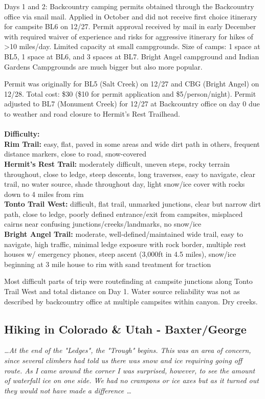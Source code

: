 \documentclass[10pt,a4paper]{article}
\newcommand\subsect[1]{%
  \subsection*{#1}%
  \addcontentsline{toc}{subsection}{#1}}
\begin{document}
\begin{multicols}{2}
Days 1 and 2: Backcountry camping permits obtained through the Backcountry office via snail mail. Applied in October and did not receive first choice itinerary for campsite BL6 on 12/27. Permit approval received by mail in early December with required waiver of experience and risks for aggressive itinerary for hikes of >10 miles/day. Limited capacity at small campgrounds. Size of camps: 1 space at BL5, 1 space at BL6, and 3 spaces at BL7. Bright Angel campground and Indian Gardens Campgrounds are much bigger but also more popular. 

Permit was originally for BL5 (Salt Creek) on 12/27 and CBG (Bright Angel) on 12/28. Total cost: \$30 (\$10 for permit application and \$5/person/night). Permit adjusted to BL7 (Monument Creek) for 12/27 at Backcountry office on day 0 due to weather and road closure to Hermit's Rest Trailhead.
\\
\\
\textbf{Difficulty: }\\
\textbf{Rim Trail:} easy, flat, paved in some areas and wide dirt path in others, frequent distance markers, close to road, snow-covered\\
\textbf{	Hermit's Rest Trail:} moderately difficult, uneven steps, rocky terrain throughout, close to ledge, steep descents, long traverses, easy to navigate, clear trail, no water source, shade throughout day, light snow/ice cover with rocks down to 4 miles from rim\\
\textbf{	Tonto Trail West:} difficult, flat trail, unmarked junctions, clear but narrow dirt path, close to ledge, poorly defined entrance/exit from campsites, misplaced cairns near confusing junctions/creeks/landmarks, no snow/ice\\
\textbf{	Bright Angel Trail:} moderate, well-defined/maintained wide trail, easy to navigate, high traffic, minimal ledge exposure with rock border, multiple rest houses w/ emergency phones, steep ascent (3,000ft in 4.5 miles), snow/ice beginning at 3 mile house to rim with sand treatment for traction

	Most difficult parts of trip were routefinding at campsite junctions along Tonto Trail West and total distance on Day 1. Water source reliability was not as described by backcountry office at multiple campsites within canyon. Dry creeks.

\pagebreak

\subsect{Hiking in Colorado \& Utah - Baxter/George}

\small
{\it \dots At the end of the "Ledges", the "Trough" begins. This was an area of concern, since several climbers had told us there was snow and ice requiring going off route. As I came around the corner I was surprised, however, to see the amount of waterfall ice on one side. We had no crampons or ice axes but as it turned out they would not have made a difference \dots}
\normalsize


\end{multicols}
\end{document}
